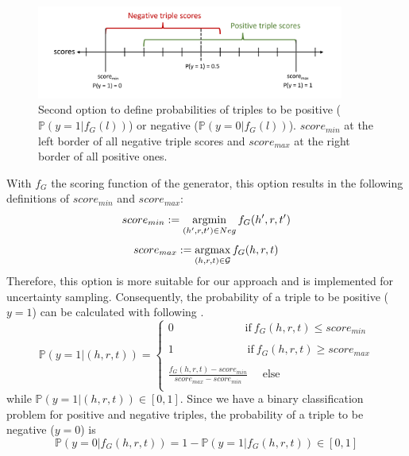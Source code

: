 \begin{figure}[H]
  \centering
    \includegraphics[width=0.9\textwidth]{figures/positives_negatives2.pdf}
  \caption{Second option to define probabilities of triples to be positive ($\mathds{P}(y = 1 | f_G(l))$) or negative ($\mathds{P}(y = 0 | f_G(l))$). 
  $score_{min}$ at the left border of all negative triple scores and $score_{max}$ at the right border of all positive ones.}
  \label{fig:positives_negatives2}
\end{figure}
With $f_G$ the scoring function of the generator, this option results in the following definitions of $score_{min}$ and $score_{max}$:
\begin{equation} \label{eqn:opt1_score_min}
    score_{min} := \operatorname*{argmin}_{(h',r,t') \in Neg}{f_G(h',r,t')}
\end{equation}
\begin{equation} \label{eqn:opt1_score_max}
    score_{max} := \operatorname*{argmax}_{(h,r,t) \in \mathcal{G}}{f_G(h,r,t)}
\end{equation}
\clearpage
Therefore, this option is more suitable for our approach and is implemented for uncertainty sampling.
Consequently, the probability of a triple to be positive ($y = 1$) can be calculated with following .
\begin{equation}  \label{eqn:positive_probability}
    \mathds{P}(y = 1|(h, r, t)) =
    \begin{cases}
        0 \ \ \ \ \ \ \ \ \ \ \ \ \ \ \ \ \ \ \ \ \ \ \ \ \ \ \  \ \   
         \text{if} \  f_G(h,r,t) \leq score_{min}
         
        \\ \\
        1 \ \ \ \ \ \ \ \ \ \ \ \ \ \ \ \ \ \ \ \ \ \ \ \ \ \ \   \ \ \
        \text{if} \ f_G(h,r,t) \geq score_{max}
         
        \\ \\
        \frac{f_G(h,r,t) - score_{min}}{score_{max} - score_{min}}
        \ \ \ \ \ \ 
         \text{else}
        \\
    \end{cases} 
\end{equation}
while $\mathds{P}(y = 1|(h, r, t))  \in [0, 1]$.
Since we have a binary classification problem for positive and negative triples, the probability of a triple to be negative ($y=0$) is
\begin{equation} \label{eqn:negative_probability}
    \mathds{P}(y = 0 | f_G(h, r, t)) = 1 - \mathds{P}(y = 1| f_G(h, r, t)) \in [0,1]
\end{equation}